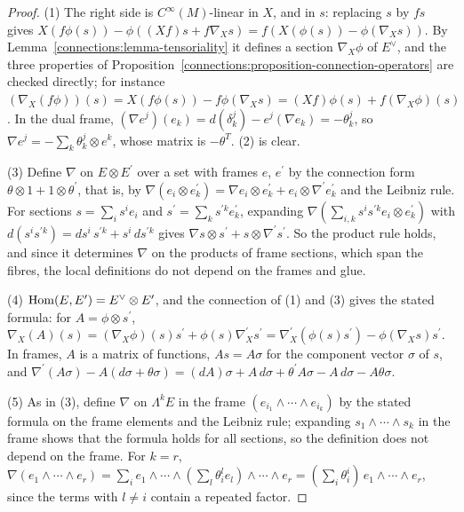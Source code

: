\begin{proof}
(1) The right side is $C^\infty(M)$-linear in $X$, and in $s$: replacing $s$ by $fs$ gives $X(f\phi(s)) - \phi((Xf)s + f\nabla_Xs) = f(X(\phi(s)) - \phi(\nabla_Xs))$. By
Lemma~\ref{connections:lemma-tensoriality} it defines a section $\nabla_X\phi$ of $E^\vee$, and the three properties of
Proposition~\ref{connections:proposition-connection-operators} are checked directly; for instance $(\nabla_X(f\phi))(s) = X(f\phi(s)) - f\phi(\nabla_Xs) = (Xf)\phi(s) + f(\nabla_X\phi)(s)$.
In the dual frame, $(\nabla e^j)(e_k) = d(\delta^j_k) - e^j(\nabla e_k) = -\theta^j_k$, so $\nabla e^j = -\sum_k\theta^j_k \otimes e^k$, whose matrix is $-\theta^T$. (2) is clear.

(3) Define $\nabla$ on $E \otimes E^{\prime}$ over a set with frames $e$, $e^{\prime}$ by the connection form $\theta \otimes 1 + 1 \otimes \theta^{\prime}$, that is, by
$\nabla(e_i \otimes e^{\prime}_k) = \nabla e_i \otimes e^{\prime}_k + e_i \otimes \nabla^{\prime}e^{\prime}_k$ and the Leibniz rule. For sections $s = \sum_is^ie_i$ and
$s^{\prime} = \sum_ks^{\prime k}e^{\prime}_k$, expanding $\nabla(\sum_{i,k}s^is^{\prime k}e_i \otimes e^{\prime}_k)$ with $d(s^is^{\prime k}) = ds^i\,s^{\prime k} + s^i\,ds^{\prime k}$ gives
$\nabla s \otimes s^{\prime} + s \otimes \nabla^{\prime}s^{\prime}$. So the product rule holds, and since it determines $\nabla$ on the products of frame sections, which span the fibres,
the local definitions do not depend on the frames and glue.

(4) $\operatorname{Hom}(E, E^{\prime}) = E^\vee \otimes E^{\prime}$, and the connection of (1) and (3) gives the stated formula: for $A = \phi \otimes s^{\prime}$,
$\nabla_X(A)(s) = (\nabla_X\phi)(s)s^{\prime} + \phi(s)\nabla^{\prime}_Xs^{\prime} = \nabla^{\prime}_X(\phi(s)s^{\prime}) - \phi(\nabla_Xs)s^{\prime}$. In frames, $A$ is a matrix of functions,
$As = A\sigma$ for the component vector $\sigma$ of $s$, and $\nabla^{\prime}(A\sigma) - A(d\sigma + \theta\sigma) = (dA)\sigma + A\,d\sigma + \theta^{\prime}A\sigma - A\,d\sigma - A\theta\sigma$.

(5) As in (3), define $\nabla$ on $\Lambda^kE$ in the frame $(e_{i_1} \wedge \cdots \wedge e_{i_k})$ by the stated formula on the frame elements and the Leibniz rule; expanding
$s_1 \wedge \cdots \wedge s_k$ in the frame shows that the formula holds for all sections, so the definition does not depend on the frame. For $k = r$,
$\nabla(e_1 \wedge \cdots \wedge e_r) = \sum_ie_1 \wedge \cdots \wedge (\sum_l\theta^l_ie_l) \wedge \cdots \wedge e_r = (\sum_i\theta^i_i)\,e_1 \wedge \cdots \wedge e_r$, since the terms with
$l \neq i$ contain a repeated factor.
\end{proof}

